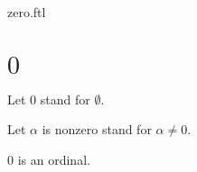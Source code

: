 \documentclass{naproche-library}
\begin{document}
\begin{smodule}{zero.ftl}

  \section*{$0$}

  \begin{forthel}
    Let $0$ stand for $\emptyset$.

    Let $\alpha$ is nonzero stand for $\alpha \neq 0$.
  \end{forthel}

  \begin{proposition}[forthel,id=SET_THEORY_02_8483196888940544]
    $0$ is an ordinal.
  \end{proposition}
\end{smodule}
\end{document}
